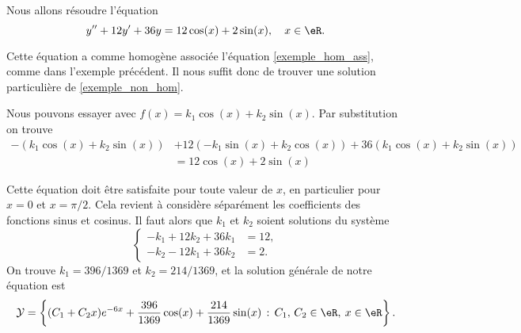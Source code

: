 \begin{example}
	Nous allons résoudre l'équation
	\begin{equation}
		y'' + 12y' + 36 y = 12\cos(x) + 2\sin(x), \quad x\in\eR.
	\end{equation}

	Cette équation a comme homogène associée l'équation \eqref{exemple_hom_ass}, comme dans l'exemple précédent. Il nous suffit donc de trouver une solution particulière de \eqref{exemple_non_hom}.

	Nous pouvons essayer avec \( f(x)= k_1\cos(x) + k_2\sin(x)\). Par substitution on trouve
	\begin{equation*}
		\begin{aligned}
			-\left(k_1\cos(x) + k_2\sin(x)\right) & +12 \left(-k_1\sin(x) + k_2\cos(x)\right) + 36\left(k_1\cos(x) + k_2\sin(x)\right) \\
			                                      & = 12\cos(x) + 2\sin(x)
		\end{aligned}
	\end{equation*}

	Cette équation doit \^etre satisfaite pour toute valeur de \( x\), en particulier pour \( x= 0\) et \( x = \pi/2\). Cela revient à considère séparément les coefficients des fonctions sinus et cosinus. Il faut alors que \( k_1\) et \( k_2\) soient solutions du système
	\begin{equation*}
		\begin{cases}
			-k_1 + 12 k_2 + 36 k_1 & = 12, \\
			-k_2 - 12 k_1 + 36 k_2 & = 2.
		\end{cases}
	\end{equation*}
	On trouve \( k_1= 396/1369\) et \( k_2 = 214/1369\), et la solution générale de notre équation est
	\begin{equation*}
		\mathcal{Y}  = \left\{(C_1  +C_2x) e^{-6 x} +\frac{396}{1369}\cos(x) + \frac{214}{1369}\sin(x) \,:\, C_1,\, C_2 \in \eR, \: x\in \eR\right\}.
	\end{equation*}
\end{example}

